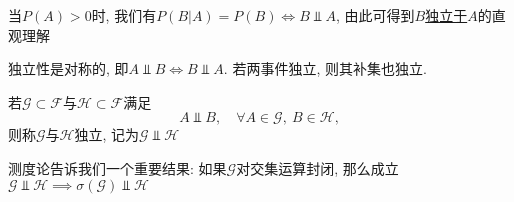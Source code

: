 \begin{note}
    当$P(A)>0$时, 我们有$ P(B|A) = P(B) \iff B \Vbar A$, 由此可得到\underline{$B$独立于$A$}的直观理解
\end{note}

\begin{property}
    独立性是对称的, 即$A \Vbar B \iff B \Vbar A$. 若两事件独立, 则其补集也独立.
    \begin{center}
    \end{center}
\end{property}

\begin{definition}[事件域的独立性]
    若$\mathscr{G} \subset \mathscr{F}$与$\mathscr{H} \subset \mathscr{F}$满足
    \[ A \Vbar B, \quad \forall A\in\mathscr{G},\ B\in\mathscr{H}, \]
    则称$\mathscr{G}$与$\mathscr{H}$独立, 记为$\mathscr{G} \Vbar \mathscr{H}$
\end{definition}

测度论告诉我们一个重要结果: 如果$\mathscr{G}$对交集运算封闭, 那么成立$\mathscr{G}\Vbar\mathscr{H} \implies \sigma(\mathscr{G}) \Vbar \mathscr{H}$

